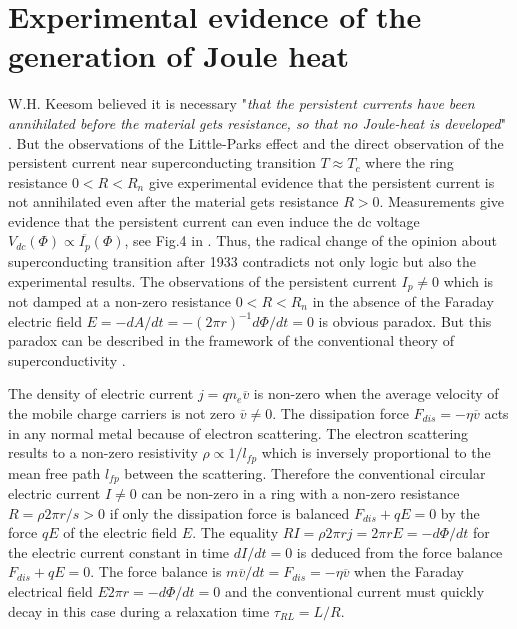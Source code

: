 \documentclass[twocolumn,secnumarabic,amssymb, nobibnotes, aps, prd]{revtex4}
\begin{document}
\section{Experimental evidence of the generation of Joule heat}
W.H. Keesom believed it is necessary "{\it that the persistent currents have been annihilated before the material gets resistance, so that no Joule-heat is developed}" \cite{Keesom1934}. But the observations of the Little-Parks effect \cite{LP1962,Letter2007} and the direct observation \cite{PC2007} of the persistent current near superconducting transition $T \approx T_{c}$ where the ring resistance $0 < R < R_{n}$ give experimental evidence that the persistent current is not annihilated even after the material gets resistance $R > 0$. Measurements give evidence that the persistent current can even induce the dc voltage $V _{dc}(\Phi ) \propto \overline{I_{p}}(\Phi )$, see Fig.4 in \cite{Physica2019}. Thus, the radical change of the opinion about superconducting transition after 1933 contradicts not only logic but also the experimental results. The observations \cite{LP1962,Letter2007,PC2007} of the persistent current $I_{p} \neq 0$ which is not damped at a non-zero resistance $0 < R < R_{n}$ in the absence of the Faraday electric field $E = -dA/dt = -(2\pi r)^{-1}d\Phi /dt = 0$ is obvious paradox. But this paradox can be described in the framework of the conventional theory of superconductivity \cite{GL1950}.    

The density of electric current $j = qn_{e}\overline{v}$ is non-zero when the average velocity of the mobile charge carriers is not zero $\overline{v} \neq 0$. The dissipation force $F_{dis} = -\eta \overline{v}$ acts in any normal metal because of electron scattering. The electron scattering results to a non-zero resistivity $\rho \propto 1/l_{fp}$ which is inversely proportional to the mean free path $l_{fp}$ between the scattering. Therefore the conventional circular electric current $I \neq 0$ can be non-zero in a ring with a non-zero resistance $R = \rho 2\pi r/s > 0$ if only the dissipation force is balanced $F_{dis} + qE = 0$ by the force $qE$ of the electric field $E$. The equality $RI = \rho 2\pi r j = 2\pi r E = - d\Phi /dt$ for the electric current constant in time $dI/dt = 0$ is deduced from the force balance $F_{dis} + qE = 0$. The force balance is $m\overline{v}/dt = F_{dis} = -\eta \overline{v}$ when the Faraday electrical field $E 2\pi r = -d\Phi /dt = 0$ and the conventional current must quickly decay in this case during a relaxation time $\tau_{RL} = L/R$. 
\end{document}
